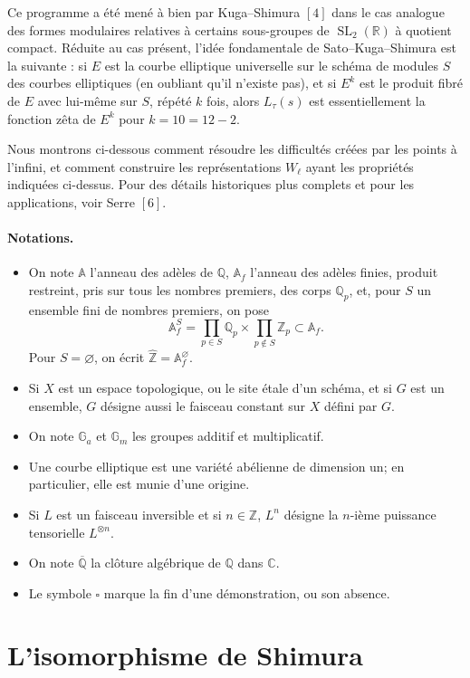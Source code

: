 \documentclass[10pt]{article}
\newcommand{\A}{\mathbb A}
\newcommand{\Af}{\mathbb A_f}
\newcommand{\C}{\mathbb C}
\newcommand{\Q}{\mathbb Q}
\newcommand{\R}{\mathbb R}
\newcommand{\Z}{\mathbb Z}
\newcommand{\bZ}{\widehat{\mathbb Z}}
\newcommand{\Ga}{\mathbb G_a}
\newcommand{\Gm}{\mathbb G_m}
\newcommand{\SL}{\operatorname{SL}}
\begin{document}
Ce programme a été mené à bien par Kuga--Shimura \([4]\) dans le cas analogue des
formes modulaires relatives à certains sous-groupes de $\SL_2(\R)$ à quotient compact.
Réduite au cas présent, l'idée fondamentale de Sato--Kuga--Shimura est la suivante :
si $E$ est la courbe elliptique universelle sur le schéma de modules $S$ des courbes
elliptiques (en oubliant qu'il n'existe pas), et si $E^k$ est le produit fibré de $E$ avec
lui-même sur $S$, répété $k$ fois, alors $L_\tau(s)$ est essentiellement la fonction zêta
de $E^k$ pour
$k=10=12-2$.

Nous montrons ci-dessous comment résoudre les difficultés créées par les points à
l'infini, et comment construire les représentations $W_\ell$ ayant les propriétés indiquées
ci-dessus. Pour des détails historiques plus complets et pour les applications, voir Serre
\([6]\).

\paragraph{Notations.}
\begin{itemize}
\item On note $\A$ l'anneau des adèles de $\Q$, $\Af$ l'anneau des adèles finies, produit
restreint, pris sur tous les nombres premiers, des corps $\Q_p$, et, pour $S$ un ensemble
fini de nombres premiers, on pose
\[
\Af^S=\prod_{p\in S}\Q_p\times\prod_{p\notin S}\Z_p\subset \Af .
\]
Pour $S=\varnothing$, on écrit $\bZ=\Af^\varnothing$.
\item Si $X$ est un espace topologique, ou le site étale d'un schéma, et si $G$ est un
ensemble, $G$ désigne aussi le faisceau constant sur $X$ défini par $G$.
\item On note $\Ga$ et $\Gm$ les groupes additif et multiplicatif.
\item Une courbe elliptique est une variété abélienne de dimension un; en particulier, elle
est munie d'une origine.
\item Si $L$ est un faisceau inversible et si $n\in\Z$, $L^n$ désigne la $n$-ième puissance
tensorielle $L^{\otimes n}$.
\item On note $\overline{\Q}$ la clôture algébrique de $\Q$ dans $\C$.
\item Le symbole $\square$ marque la fin d'une démonstration, ou son absence.
\end{itemize}

\section{L'isomorphisme de Shimura}
\end{document}
